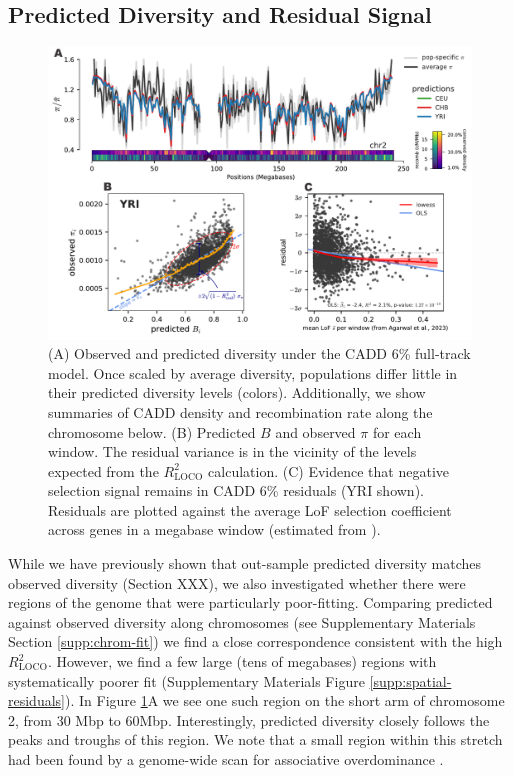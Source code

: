 \documentclass[11pt]{article}
\begin{document}
\subsection*{Predicted Diversity and Residual Signal}

\begin{figure}[htbp] \centering
    \includegraphics[width=\textwidth]{figures/figure_6.pdf} 

    \caption{(A) Observed and predicted diversity under the CADD 6\% full-track
        model. Once scaled by average diversity, populations differ little in
        their predicted diversity levels (colors). Additionally, we show
        summaries of CADD density and recombination rate along the chromosome
        below. (B) Predicted $B$ and observed $\pi$ for each window. The
        residual variance is in the vicinity of the levels expected from the
        $R_\text{LOCO}^2$ calculation. (C) Evidence that negative selection
    signal remains in CADD 6\% residuals (YRI shown). Residuals are plotted
against the average LoF selection coefficient across genes in a megabase window
(estimated from \cite{Agarwal2023-un}).}

  \label{fig:figure-5}
\end{figure}

While we have previously shown that out-sample predicted diversity matches
observed diversity (Section XXX), we also investigated whether there were
regions of the genome that were particularly poor-fitting. Comparing predicted
against observed diversity along chromosomes (see Supplementary Materials
Section \ref{supp:chrom-fit}) we find a close correspondence consistent with
the high $R_\text{LOCO}^2$. However, we find a few large (tens of megabases)
regions with systematically poorer fit (Supplementary Materials Figure
\ref{supp:spatial-residuals}). In Figure \ref{fig:figure-5}A we see one such
region on the short arm of chromosome 2, from 30 Mbp to 60Mbp. Interestingly,
predicted diversity closely follows the peaks and troughs of this region. We
note that a small region within this stretch had been found by a genome-wide
scan for associative overdominance \parencite{Gilbert2020-aw}.  
\end{document}
